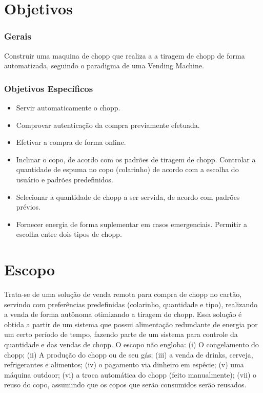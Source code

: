 \section{Objetivos}

\subsubsection{Gerais}

    Construir uma maquina de chopp que realiza a a tiragem de chopp de forma automatizada, seguindo o paradigma de uma Vending Machine.
    
\subsubsection{Objetivos Específicos}

\begin{itemize}
\item{Servir automaticamente o chopp.}

\item{Comprovar autenticação da compra previamente efetuada.}

\item{Efetivar a compra  de forma online.}

\item{Inclinar o copo, de acordo com os padrões de tiragem de chopp.
Controlar a quantidade de espuma no copo (colarinho) de acordo com a escolha do usuário e padrões predefinidos.}

\item{Selecionar a quantidade de chopp a ser servida, de acordo com padrões prévios.}

\item{Fornecer energia de forma suplementar em casos emergenciais.
Permitir a escolha entre dois tipos de chopp.}

\end{itemize}


\section{Escopo}

Trata-se de uma solução de venda remota para compra de chopp no cartão, servindo com preferências predefinidas (colarinho, quantidade e tipo), realizando a venda de forma autônoma otimizando a tiragem do chopp. Essa solução é obtida a partir de um sistema que possui alimentação redundante de energia por um certo período de tempo, fazendo parte de um sistema para controle da quantidade e das vendas de chopp. O escopo não engloba: (i) O congelamento do chopp; (ii) A produção do chopp ou de seu gás; (iii) a venda de drinks, cerveja, refrigerantes e alimentos; (iv) o pagamento via dinheiro em espécie; (v) uma máquina outdoor; (vi) a troca automática do chopp (feito manualmente); (vii) o reuso do copo, assumindo que os copos que serão consumidos serão reusados.

